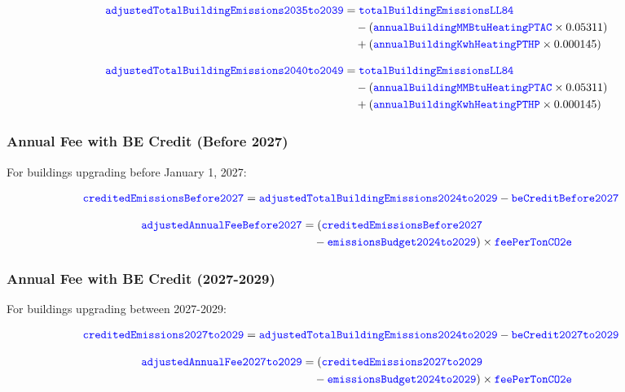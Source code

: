 \documentclass{article}
\newcommand{\code}[1]{\textcolor{blue}{\texttt{#1}}}
\begin{document}
\begin{align}
\code{adjustedTotalBuildingEmissions2035to2039} &= \code{totalBuildingEmissionsLL84} \nonumber \\
&\quad - (\code{annualBuildingMMBtuHeatingPTAC} \times 0.05311) \nonumber \\
&\quad + (\code{annualBuildingKwhHeatingPTHP} \times 0.000145)
\end{align}

\begin{align}
\code{adjustedTotalBuildingEmissions2040to2049} &= \code{totalBuildingEmissionsLL84} \nonumber \\
&\quad - (\code{annualBuildingMMBtuHeatingPTAC} \times 0.05311) \nonumber \\
&\quad + (\code{annualBuildingKwhHeatingPTHP} \times 0.000145)
\end{align}

\subsubsection{Annual Fee with BE Credit (Before 2027)}

For buildings upgrading before January 1, 2027:

\begin{align}
\code{creditedEmissionsBefore2027} &= \code{adjustedTotalBuildingEmissions2024to2029} - \code{beCreditBefore2027}
\end{align}

\begin{align}
\code{adjustedAnnualFeeBefore2027} &= (\code{creditedEmissionsBefore2027} \nonumber\\
&\quad - \code{emissionsBudget2024to2029}) \times \code{feePerTonCO2e}
\end{align}

\subsubsection{Annual Fee with BE Credit (2027-2029)}

For buildings upgrading between 2027-2029:

\begin{align}
\code{creditedEmissions2027to2029} &= \code{adjustedTotalBuildingEmissions2024to2029} - \code{beCredit2027to2029}
\end{align}

\begin{align}
\code{adjustedAnnualFee2027to2029} &= (\code{creditedEmissions2027to2029} \nonumber\\
&\quad - \code{emissionsBudget2024to2029}) \times \code{feePerTonCO2e}
\end{align}
\end{document}

